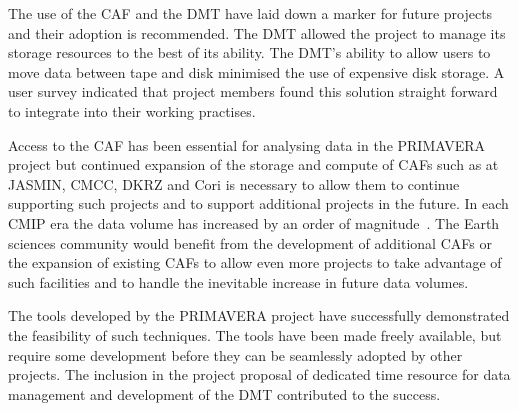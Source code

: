 \documentclass[gmd, manuscript]{copernicus}
\begin{document}
The use of the CAF and the DMT have laid down a marker for future projects and their adoption is recommended. The DMT allowed the project to manage its storage resources to the best of its ability. The DMT's ability to allow users to move data between tape and disk minimised the use of expensive disk storage. A user survey indicated that project members found this solution straight forward to integrate into their working practises.

Access to the CAF has been essential for analysing data in the PRIMAVERA project but continued expansion of the storage and compute of CAFs such as at JASMIN, CMCC, DKRZ and Cori is necessary to allow them to continue supporting such projects and to support additional projects in the future. In each CMIP era the data volume has increased by an order of magnitude~\citep{gmd-11-3659-2018}. The Earth sciences community would benefit from the development of additional CAFs or the expansion of existing CAFs to allow even more projects to take advantage of such facilities and to handle the inevitable increase in future data volumes.

The tools developed by the PRIMAVERA project have successfully demonstrated the feasibility of such techniques. The tools have been made freely available, but require some development before they can be seamlessly adopted by other projects. The inclusion in the project proposal of dedicated time resource for data management and development of the DMT contributed to the success.


\end{document}
